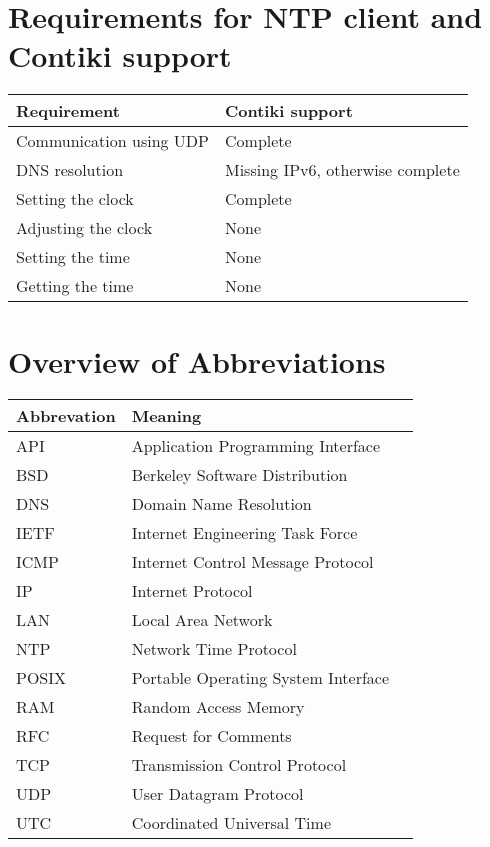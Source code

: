 \chapter{Requirements for NTP client and Contiki support}\label{app:requirements}
\begin{tabular}{|l|l|}
	\hline
	Requirement & Contiki support \\ \hline
	Communication using UDP & Complete \\
	DNS resolution & Missing IPv6, otherwise complete \\
	Setting the clock & Complete \\
	Adjusting the clock & None \\
	Setting the time & None \\
	Getting the time & None \\
	\hline
\end{tabular}

\chapter{Overview of Abbreviations}
\begin{tabular}{|l|l|l|}
	\hline
	Abbrevation & Meaning \\ \hline
	API & Application Programming Interface \\
	BSD & Berkeley Software Distribution \\
	DNS & Domain Name Resolution \\
	IETF & Internet Engineering Task Force \\
	ICMP & Internet Control Message Protocol \\
	IP & Internet Protocol \\
	LAN & Local Area Network \\
	NTP & Network Time Protocol \\
	POSIX & Portable Operating System Interface \\
	RAM & Random Access Memory \\
	RFC & Request for Comments \\
	TCP & Transmission Control Protocol \\
	UDP & User Datagram Protocol \\
	UTC & Coordinated Universal Time \\
	\hline
\end{tabular}
